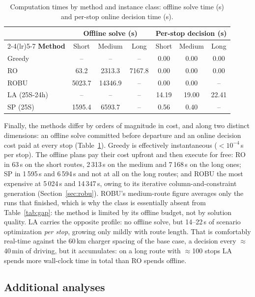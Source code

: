\begin{table}[htbp]
\centering
\caption{Computation times by method and instance class: offline solve time (s) and per-stop online decision time (s).}
\label{tab:runtime}
\begin{tabular}{lcccccc}
\toprule
& \multicolumn{3}{c}{\textbf{Offline solve (s)}} & \multicolumn{3}{c}{\textbf{Per-stop decision (s)}}\\
\cmidrule(lr){2-4}\cmidrule(lr){5-7}
\textbf{Method} & Short & Medium & Long & Short & Medium & Long\\
\midrule
Greedy & -- & -- & -- & 0.00 & 0.00 & 0.00 \\
RO & 63.2 & 2313.3 & 7167.8 & 0.00 & 0.00 & 0.00 \\
ROBU & 5023.7 & 14346.9 & -- & 0.00 & 0.00 & -- \\
LA (25S-24h) & -- & -- & -- & 14.19 & 19.00 & 22.41 \\
SP (25S) & 1595.4 & 6593.7 & -- & 0.56 & 0.40 & -- \\
\bottomrule
\end{tabular}
\end{table}

Finally, the methods differ by orders of magnitude in cost, and along two
distinct dimensions: an offline solve committed before departure and an online
decision cost paid at every stop (Table~\ref{tab:runtime}).  Greedy is
effectively instantaneous ($<10^{-4}$\,s per stop).  The offline plans pay their
cost upfront and then execute for free: RO in 63\,s on the short routes,
2\,313\,s on the medium and 7\,168\,s on the long ones; SP in 1\,595\,s and
6\,594\,s and not at all on the long routes; and ROBU the most expensive at
5\,024\,s and 14\,347\,s, owing to its iterative column-and-constraint
generation (Section~\ref{sec:robu}).  ROBU's medium-route figure averages only
the runs that finished, which is why the class is essentially absent from
Table~\ref{tab:gap}: the method is limited by its offline budget, not by
solution quality.  LA carries the opposite profile: no offline solve, but
14--22\,s of scenario optimization \emph{per stop}, growing only mildly with
route length.  That is comfortably real-time against the 60\,km charger spacing
of the base case, a decision every $\approx$40\,min of driving, but it
accumulates: on a long route with $\approx$100 stops LA spends more wall-clock
time in total than RO spends offline.


\subsection{Additional analyses}
\label{sec:additional-protocol}

